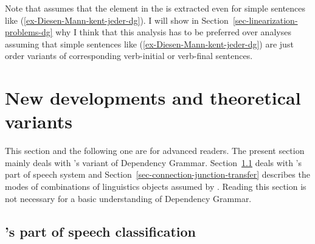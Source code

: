 Note that \citet[]{Hudson97a} assumes that the element in the \vf is extracted even for simple
sentences like (\ref{ex-Diesen-Mann-kent-jeder-dg}). I will show in Section~\ref{sec-linearization-problems-dg} why I think that
this analysis has to be preferred over analyses assuming that simple sentences like
(\ref{ex-Diesen-Mann-kent-jeder-dg}) are just order variants of corresponding verb-initial or
verb-final sentences.%

\section{New developments and theoretical variants}

\addlines[-2]
This section and the following one are for advanced readers.
The present section mainly deals with \tes's variant of Dependency Grammar. Section~\ref{sec-tesniere-pos}
deals with \tes's part of speech system and Section~\ref{sec-connection-junction-transfer} describes the modes of combinations of
linguistics objects assumed by \tes. Reading this section is not necessary for a basic understanding
of Dependency Grammar.

\subsection{\tes's part of speech classification}
\label{sec-tesniere-pos}

